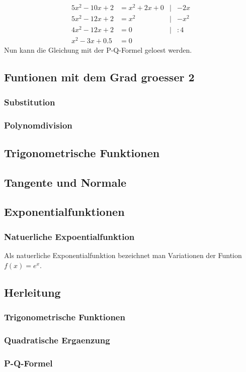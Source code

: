 \documentclass[a4paper]{article} %
\begin{document}
		\begin{align*}
			5x^2-10x+2 &= x^2+2x+0 & 	|&-2x\\
			5x^2-12x+2 &= x^2 & 		|&-x^2\\
			4x^2-12x+2 &= 0   & 		|&:4\\
			x^2-3x+0.5 &= 0 	
		\end{align*}
			Nun kann die Gleichung mit der P-Q-Formel geloest werden.
		\newpage
		\subsection{Funtionen mit dem Grad groesser 2}
		\subsubsection{Substitution}
		\subsubsection{Polynomdivision}
		\subsection{Trigonometrische Funktionen}
		\subsection{Tangente und Normale}
		\subsection{Exponentialfunktionen}
		\subsubsection{Natuerliche Expoentialfunktion}
		Als natuerliche Exponentialfunktion bezeichnet man Variationen der Funtion $f(x)=e^x$.

		\subsection{Herleitung}
		\subsubsection{Trigonometrische Funktionen}
		\subsubsection{Quadratische Ergaenzung}
		\subsubsection{P-Q-Formel}
\end{document}
